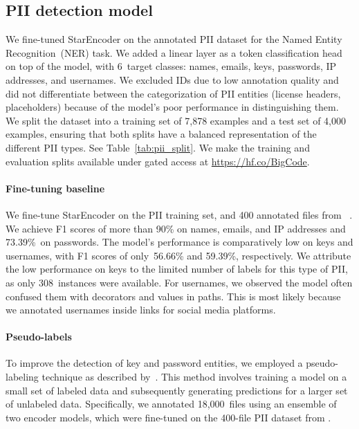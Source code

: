 \subsection{PII detection model}\label{sec:pii_model}
We fine-tuned StarEncoder on the annotated PII dataset for the Named Entity Recognition~(NER) task. We added a linear layer as a token classification head on top of the model, with 6~target classes: names, emails, keys, passwords, IP addresses, and usernames.  We excluded IDs due to low annotation quality and did not differentiate between the categorization of PII entities (license headers, placeholders) because of the model's poor performance in distinguishing them. We split the dataset into a training set of 7,878 examples and a test set of 4,000 examples, ensuring that both splits have a balanced representation of the different PII types. See Table~\ref{tab:pii_split}. We make the training and evaluation splits available under gated access at \url{https://hf.co/BigCode}.

\paragraph{Fine-tuning baseline} We fine-tune StarEncoder on the PII training set, and 400 annotated files from ~\citet{allal2023santacoder}. We achieve F1 scores of more than 90\% on names, emails, and IP addresses and 73.39\%~on passwords. The model's performance is comparatively low on keys and usernames, with F1 scores of only~56.66\% and 59.39\%, respectively. We attribute the low performance on keys to the limited number of labels for this type of PII, as only 308~instances were available. For usernames, we observed the model often confused them with decorators and values in paths. This is most likely because we annotated usernames inside links for social media platforms. 

\paragraph{Pseudo-labels} To improve the detection of key and password entities, we employed a pseudo-labeling technique as described by~\citet{lee2013pseudo}. This method involves training a model on a small set of labeled data and subsequently generating predictions for a larger set of unlabeled data. Specifically, we annotated 18,000~files using an ensemble of two encoder models, which were fine-tuned on the 400-file PII dataset from \citet{allal2023santacoder}.

